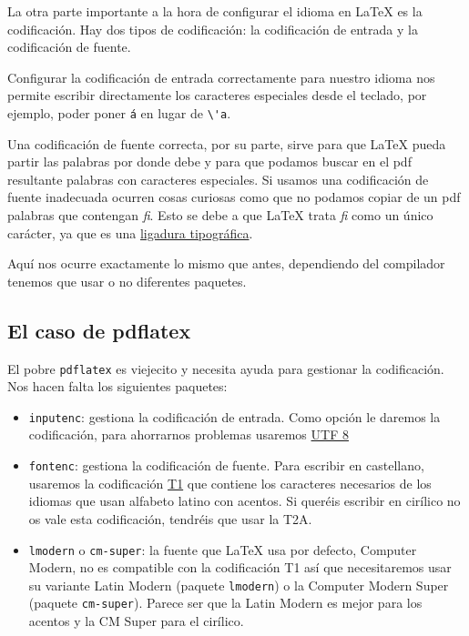 La otra parte importante a la hora de configurar el idioma en LaTeX es
la codificación. Hay dos tipos de codificación: la codificación de
entrada y la codificación de fuente.

Configurar la codificación de entrada correctamente para nuestro idioma
nos permite escribir directamente los caracteres especiales desde el
teclado, por ejemplo, poder poner \lstinline!á! en lugar de \lstinline!\'a!.

Una codificación de fuente correcta, por su parte, sirve para que LaTeX
pueda partir las palabras por donde debe y para que podamos buscar en el
pdf resultante palabras con caracteres especiales. Si usamos una
codificación de fuente inadecuada ocurren cosas curiosas como que no
podamos copiar de un pdf palabras que contengan \emph{fi}. Esto se debe a que
LaTeX trata \emph{fi} como un único carácter, ya que es una \href{https://es.wikipedia.org/wiki/Ligadura_(tipograf\%C3\%ADa)}{ligadura
tipográfica}.

Aquí nos ocurre exactamente lo mismo que antes, dependiendo del
compilador tenemos que usar o no diferentes paquetes.

\subsection{El caso de pdflatex}\label{sec:pdflatex}

El pobre \lstinline!pdflatex! es viejecito y necesita ayuda para gestionar la
codificación. Nos hacen falta los siguientes paquetes:

\begin{itemize}
\item
  \lstinline!inputenc!: gestiona la codificación de entrada. Como opción le daremos
  la codificación, para ahorrarnos problemas usaremos \href{https://en.wikipedia.org/wiki/UTF-8}{UTF 8}
\item
  \lstinline!fontenc!: gestiona la codificación de fuente. Para escribir en
  castellano, usaremos la codificación \href{https://en.wikipedia.org/wiki/Cork_encoding}{T1} que contiene los caracteres
  necesarios de los idiomas que usan alfabeto latino con acentos. Si
  queréis escribir en cirílico no os vale esta codificación, tendréis
  que usar la T2A.
\item
  \lstinline!lmodern! o \lstinline!cm-super!: la fuente que LaTeX usa por defecto, Computer
  Modern, no es compatible con la codificación T1 así que necesitaremos
  usar su variante Latin Modern (paquete \lstinline!lmodern!) o la Computer Modern
  Super (paquete \lstinline!cm-super!). Parece ser que la Latin Modern es mejor para
  los acentos y la CM Super para el cirílico.
\end{itemize}

